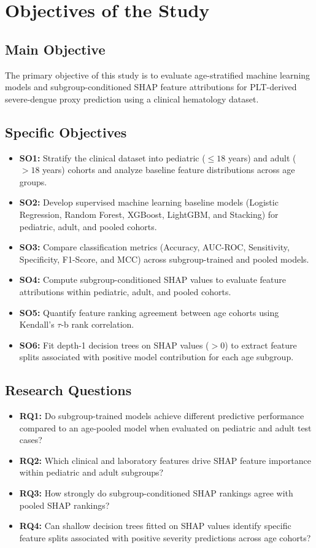 \documentclass[12pt, a4paper]{report}
\begin{document}
\section{Objectives of the Study}
\subsection{Main Objective}
The primary objective of this study is to evaluate age-stratified machine learning models and subgroup-conditioned SHAP feature attributions for PLT-derived severe-dengue proxy prediction using a clinical hematology dataset.

\subsection{Specific Objectives}
\begin{itemize}
    \item \textbf{SO1:} Stratify the clinical dataset into pediatric ($\le 18$ years) and adult ($> 18$ years) cohorts and analyze baseline feature distributions across age groups.
    \item \textbf{SO2:} Develop supervised machine learning baseline models (Logistic Regression, Random Forest, XGBoost, LightGBM, and Stacking) for pediatric, adult, and pooled cohorts.
    \item \textbf{SO3:} Compare classification metrics (Accuracy, AUC-ROC, Sensitivity, Specificity, F1-Score, and MCC) across subgroup-trained and pooled models.
    \item \textbf{SO4:} Compute subgroup-conditioned SHAP values to evaluate feature attributions within pediatric, adult, and pooled cohorts.
    \item \textbf{SO5:} Quantify feature ranking agreement between age cohorts using Kendall's $\tau$-b rank correlation.
    \item \textbf{SO6:} Fit depth-1 decision trees on SHAP values ($> 0$) to extract feature splits associated with positive model contribution for each age subgroup.
\end{itemize}

\subsection{Research Questions}
\begin{itemize}
    \item \textbf{RQ1:} Do subgroup-trained models achieve different predictive performance compared to an age-pooled model when evaluated on pediatric and adult test cases?
    \item \textbf{RQ2:} Which clinical and laboratory features drive SHAP feature importance within pediatric and adult subgroups?
    \item \textbf{RQ3:} How strongly do subgroup-conditioned SHAP rankings agree with pooled SHAP rankings?
    \item \textbf{RQ4:} Can shallow decision trees fitted on SHAP values identify specific feature splits associated with positive severity predictions across age cohorts?
\end{itemize}
\end{document}

